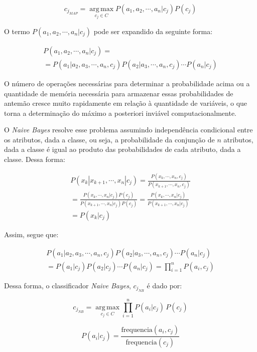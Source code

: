 \documentclass{article}
\begin{document}
\begin {equation}
c_{j_{MAP}} = \operatorname*{arg\,max}_{c_j \in C} P(a_1,a_2,\cdots,a_n|c_j) P(c_j)
\end {equation}

O termo $P(a_1,a_2,\cdots,a_n|c_j)$ pode ser expandido da seguinte forma:

\small
\begin {multline}
P(a_1,a_2,\cdots,a_n|c_j) = \\
= P(a_1|a_2,a_3,\cdots,a_n,c_j) P(a_2|a_3,\cdots,a_n,c_j) \cdots P(a_n|c_j)
\end{multline}
\normalsize

O número de operações necessárias para determinar a probabilidade acima ou a quantidade de memória necessária para armazenar essas probabilidades de antemão cresce muito rapidamente em relação à quantidade de variáveis,
o que torna a determinação do máximo a posteriori inviável computacionalmente.

O {\it Naive Bayes} resolve esse problema assumindo independência condicional entre os atributos,
dada a classe, ou seja, a probabilidade da conjunção de $n$ atributos,
dada a classe é igual ao produto das probabilidades de cada atributo, dada a classe. Dessa forma:

\begin{multline}
P(x_k|x_{k+1},\cdots,x_n|c_j) = \frac{P(x_k,\cdots,x_n,c_j)}{P(x_{k+1},\cdots,x_n,c_j)} \\
= \frac{P(x_k,\cdots,x_n|c_j) P(c_j)}{P(x_{k+1},\cdots,x_n|c_j) P(c_j)} = \frac{P(x_k,\cdots,x_n|c_j)}{P(x_{k+1},\cdots,x_n|c_j)} \\
= P(x_k|c_j)
\end{multline}

Assim, segue que:

\small
\begin{multline}
P(a_1|a_2,a_3,\cdots,a_n,c_j) P(a_2|a_3,\cdots,a_n,c_j) \cdots P(a_n|c_j) \\
= P(a_1|c_j) P(a_2|c_j) \cdots P(a_n|c_j) = \prod_{i=1}^n P(a_i,c_j)
\end{multline}
\normalsize

Dessa forma, o classificador {\it Naive Bayes}, $c_{j_{NB}}$ é dado por:

\begin{equation}
c_{j_{NB}} = \operatorname*{arg\,max}_{c_j \in C} \prod_{i=1}^n P(a_i|c_j) \, P(c_j)
\end{equation}

\begin{equation}
P(a_i|c_j) = \frac{\mathrm{frequencia}(a_i,c_j)}{\mathrm{frequencia}(c_j)}
\end{equation}
\end{document}
